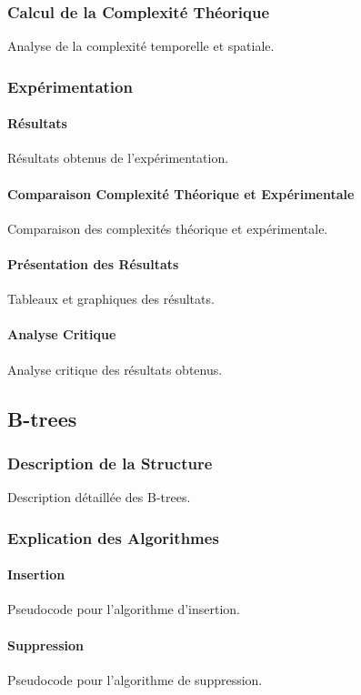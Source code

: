 \documentclass[a4paper, 12pt]{article}
\begin{document}
\subsubsection{Calcul de la Complexité Théorique}
Analyse de la complexité temporelle et spatiale.

\subsubsection{Expérimentation}
\paragraph{Résultats}
Résultats obtenus de l'expérimentation.

\paragraph{Comparaison Complexité Théorique et Expérimentale}
Comparaison des complexités théorique et expérimentale.

\paragraph{Présentation des Résultats}
Tableaux et graphiques des résultats.

\paragraph{Analyse Critique}
Analyse critique des résultats obtenus.

\subsection{B-trees}
\subsubsection{Description de la Structure}
Description détaillée des B-trees.

\subsubsection{Explication des Algorithmes}
\paragraph{Insertion}
Pseudocode pour l'algorithme d'insertion.

\paragraph{Suppression}
Pseudocode pour l'algorithme de suppression.
\end{document}
